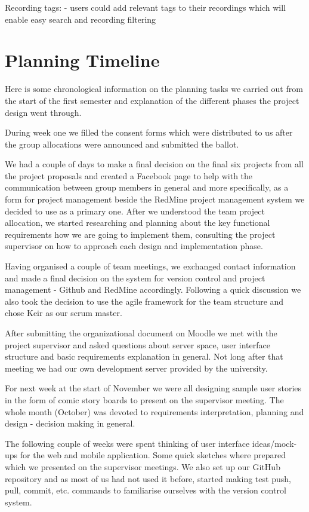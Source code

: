 \documentclass{l3proj}
\begin{document}
		Recording tags:
			- users could add relevant tags to their recordings which will enable easy search and recording filtering


\section{Planning Timeline}

Here is some chronological information on the planning tasks we carried out from the start of the first semester and explanation of the different phases the project design went through.

During week one we filled the consent forms which were distributed to us after the group allocations were announced and submitted the ballot.

We had a couple of days to make a final decision on the final six projects from all the project proposals and created a Facebook page to help with the communication between group members in general and more specifically, as a form for project management beside the RedMine project management system we decided to use as a primary one.
After we understood the team project allocation, we started researching and planning about the key functional requirements how we are going to implement them, consulting the project supervisor on how to approach each design and implementation phase.

Having organised a couple of team meetings, we exchanged contact information and made a final decision on the system for version control and project management - Github and RedMine accordingly. Following a quick discussion we also took the decision to use the agile framework for the team structure and chose Keir as our scrum master.

After submitting the organizational document on Moodle we met with the project supervisor and asked questions about server space, user interface structure and basic requirements explanation in general. Not long after that meeting we had our own development server provided by the university.

For next week at the start of November we were all designing sample user stories in the form of comic story boards to present on the supervisor meeting. The whole month (October) was devoted to requirements interpretation, planning and design - decision making in general.

The following couple of weeks were spent thinking of user interface ideas/mock-ups for the web and mobile application. Some quick sketches where prepared which we presented on the supervisor meetings. We also set up our GitHub repository and as most of us had not used it before, started making test push, pull, commit, etc. commands to familiarise ourselves with the version control system. 
\end{document}
